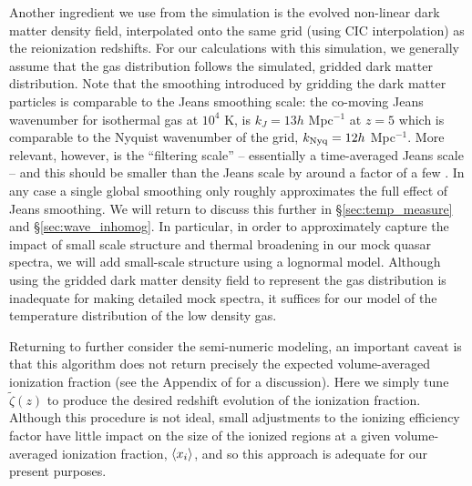 Another ingredient we use from the \citet{McQuinn:2007dy} simulation is the evolved non-linear
dark matter density field, interpolated onto the same grid (using CIC interpolation) as the reionization redshifts. For our calculations with this simulation, we generally assume that
the gas distribution follows the simulated, gridded dark matter distribution. Note that the smoothing introduced by gridding the dark matter particles is
comparable to the Jeans smoothing scale:
the co-moving Jeans wavenumber for isothermal gas
at $10^4$ K, is $k_J = 13 h$ Mpc$^{-1}$ at $z=5$ which is comparable to the Nyquist wavenumber of the grid, $k_{\rm Nyq} = 12 h$ Mpc$^{-1}$.
More relevant, however, is the ``filtering scale'' -- essentially a time-averaged Jeans scale -- and this should be smaller than the Jeans scale by around a factor of a few \citep{Gnedin:1997td}. In any case a single global smoothing only roughly approximates the full effect of Jeans smoothing. We will return to discuss this further in \S \ref{sec:temp_measure} and \S \ref{sec:wave_inhomog}. In particular, in order to approximately 
capture the impact of small scale structure and thermal broadening in our mock quasar spectra, we will add small-scale structure using a lognormal model. Although using the gridded dark matter density field to represent the gas distribution is inadequate for making detailed mock spectra, it suffices for our model of the temperature distribution of the low density gas.

Returning to further consider the semi-numeric modeling, an important caveat is that this algorithm does not return precisely the
expected volume-averaged ionization fraction (see the Appendix of \citealt{Zahn:2006sg} for a discussion). 
Here we simply tune $\tilde{\zeta}(z)$
to produce the desired redshift evolution of the ionization fraction. 
Although this procedure is not
ideal, small adjustments to the ionizing efficiency factor have little impact on 
the size of the ionized regions at a given volume-averaged ionization fraction, $\langle x_i \rangle$,
and so this approach is adequate for our present purposes.


